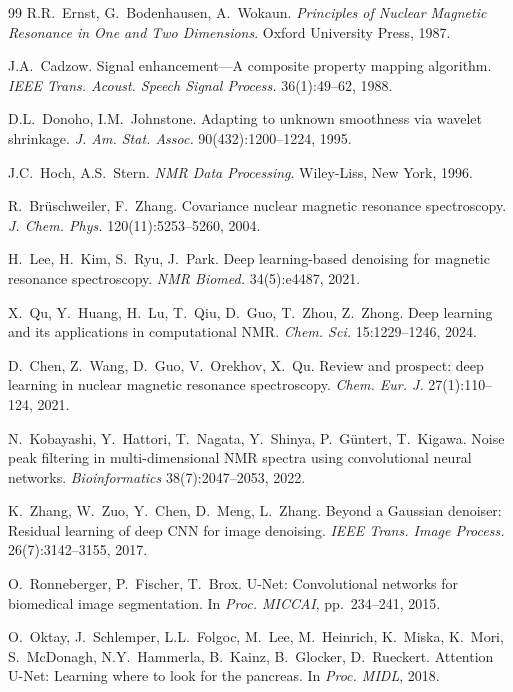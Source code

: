 \documentclass{article}
\begin{document}
{\begin{thebibliography}{99}
R.R.~Ernst, G.~Bodenhausen, A.~Wokaun.
\textit{Principles of Nuclear Magnetic Resonance in One and Two Dimensions}.
Oxford University Press, 1987.

J.A.~Cadzow.
Signal enhancement---A composite property mapping algorithm.
\textit{IEEE Trans. Acoust. Speech Signal Process.} 36(1):49--62, 1988.

D.L.~Donoho, I.M.~Johnstone.
Adapting to unknown smoothness via wavelet shrinkage.
\textit{J. Am. Stat. Assoc.} 90(432):1200--1224, 1995.

J.C.~Hoch, A.S.~Stern.
\textit{NMR Data Processing}. Wiley-Liss, New York, 1996.

R.~Brüschweiler, F.~Zhang.
Covariance nuclear magnetic resonance spectroscopy.
\textit{J. Chem. Phys.} 120(11):5253--5260, 2004.

H.~Lee, H.~Kim, S.~Ryu, J.~Park.
Deep learning-based denoising for magnetic resonance spectroscopy.
\textit{NMR Biomed.} 34(5):e4487, 2021.

X.~Qu, Y.~Huang, H.~Lu, T.~Qiu, D.~Guo, T.~Zhou, Z.~Zhong.
Deep learning and its applications in computational NMR.
\textit{Chem. Sci.} 15:1229--1246, 2024.

D.~Chen, Z.~Wang, D.~Guo, V.~Orekhov, X.~Qu.
Review and prospect: deep learning in nuclear magnetic resonance spectroscopy.
\textit{Chem. Eur. J.} 27(1):110--124, 2021.

N.~Kobayashi, Y.~Hattori, T.~Nagata, Y.~Shinya, P.~Güntert, T.~Kigawa.
Noise peak filtering in multi-dimensional NMR spectra using convolutional neural networks.
\textit{Bioinformatics} 38(7):2047--2053, 2022.

K.~Zhang, W.~Zuo, Y.~Chen, D.~Meng, L.~Zhang.
Beyond a Gaussian denoiser: Residual learning of deep CNN for image denoising.
\textit{IEEE Trans. Image Process.} 26(7):3142--3155, 2017.

O.~Ronneberger, P.~Fischer, T.~Brox.
U-Net: Convolutional networks for biomedical image segmentation.
In \textit{Proc. MICCAI}, pp.~234--241, 2015.

O.~Oktay, J.~Schlemper, L.L.~Folgoc, M.~Lee, M.~Heinrich, K.~Miska, K.~Mori, S.~McDonagh, N.Y.~Hammerla, B.~Kainz, B.~Glocker, D.~Rueckert.
Attention U-Net: Learning where to look for the pancreas.
In \textit{Proc. MIDL}, 2018.


\end{thebibliography}}
\end{document}
